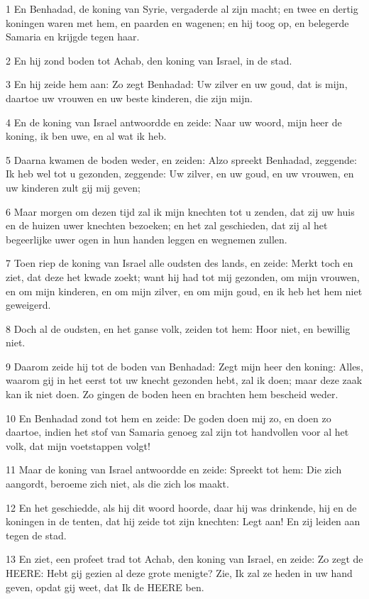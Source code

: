\par 1 En Benhadad, de koning van Syrie, vergaderde al zijn macht; en twee en dertig koningen waren met hem, en paarden en wagenen; en hij toog op, en belegerde Samaria en krijgde tegen haar.
\par 2 En hij zond boden tot Achab, den koning van Israel, in de stad.
\par 3 En hij zeide hem aan: Zo zegt Benhadad: Uw zilver en uw goud, dat is mijn, daartoe uw vrouwen en uw beste kinderen, die zijn mijn.
\par 4 En de koning van Israel antwoordde en zeide: Naar uw woord, mijn heer de koning, ik ben uwe, en al wat ik heb.
\par 5 Daarna kwamen de boden weder, en zeiden: Alzo spreekt Benhadad, zeggende: Ik heb wel tot u gezonden, zeggende: Uw zilver, en uw goud, en uw vrouwen, en uw kinderen zult gij mij geven;
\par 6 Maar morgen om dezen tijd zal ik mijn knechten tot u zenden, dat zij uw huis en de huizen uwer knechten bezoeken; en het zal geschieden, dat zij al het begeerlijke uwer ogen in hun handen leggen en wegnemen zullen.
\par 7 Toen riep de koning van Israel alle oudsten des lands, en zeide: Merkt toch en ziet, dat deze het kwade zoekt; want hij had tot mij gezonden, om mijn vrouwen, en om mijn kinderen, en om mijn zilver, en om mijn goud, en ik heb het hem niet geweigerd.
\par 8 Doch al de oudsten, en het ganse volk, zeiden tot hem: Hoor niet, en bewillig niet.
\par 9 Daarom zeide hij tot de boden van Benhadad: Zegt mijn heer den koning: Alles, waarom gij in het eerst tot uw knecht gezonden hebt, zal ik doen; maar deze zaak kan ik niet doen. Zo gingen de boden heen en brachten hem bescheid weder.
\par 10 En Benhadad zond tot hem en zeide: De goden doen mij zo, en doen zo daartoe, indien het stof van Samaria genoeg zal zijn tot handvollen voor al het volk, dat mijn voetstappen volgt!
\par 11 Maar de koning van Israel antwoordde en zeide: Spreekt tot hem: Die zich aangordt, beroeme zich niet, als die zich los maakt.
\par 12 En het geschiedde, als hij dit woord hoorde, daar hij was drinkende, hij en de koningen in de tenten, dat hij zeide tot zijn knechten: Legt aan! En zij leiden aan tegen de stad.
\par 13 En ziet, een profeet trad tot Achab, den koning van Israel, en zeide: Zo zegt de HEERE: Hebt gij gezien al deze grote menigte? Zie, Ik zal ze heden in uw hand geven, opdat gij weet, dat Ik de HEERE ben.
